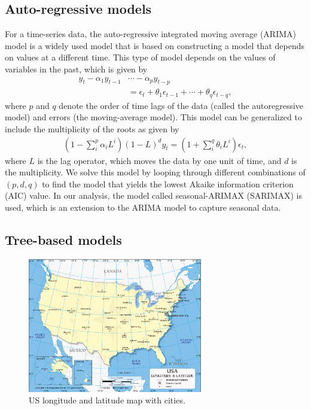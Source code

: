 \documentclass[prl,aps,superscriptaddress,twocolumn,10pt,nolongbibliography]{revtex4-2}
\begin{document}
\subsection{Auto-regressive models}
For a time-series data, the auto-regressive integrated moving average (ARIMA) model is a widely used model that is based on constructing a model that depends on values at a different time. 
This type of model depends on the values of variables in the past, which is given by 
\begin{align}
y_t - \alpha_1 y_{t-1} &\cdots - \alpha_p y_{t-p} \nonumber \\
&= \epsilon_t + \theta_1 \epsilon_{t-1} + \cdots + \theta_q \epsilon_{t-q},
\end{align}
where $p$ and $q$ denote the order of time lags of the data (called the autoregressive model) and errors (the moving-average model). 
This model can be generalized to include the multiplicity of the roots as given by 
\begin{align}
(1 - \sum_i^p \alpha_i L^i) (1 - L)^d y_t = (1 + \sum_i^q \theta_i L^i) \epsilon_t, \label{eq:arima}
\end{align}
where $L$ is the lag operator, which moves the data by one unit of time, and $d$ is the multiplicity. 
We solve this model by looping through different combinations of $(p, d, q)$ to find the model that yields the lowest Akaike information criterion (AIC) value. 
In our analysis, the model called seasonal-ARIMAX (SARIMAX) is used, which is an extension to the ARIMA model to capture seasonal data.

\subsection{Tree-based models}
\begin{figure}
\includegraphics[width=3in]{figs/geomap.jpg}
\caption{\label{fig:geomap}
US longitude and latitude map with cities.
}
\end{figure}
\end{document}
